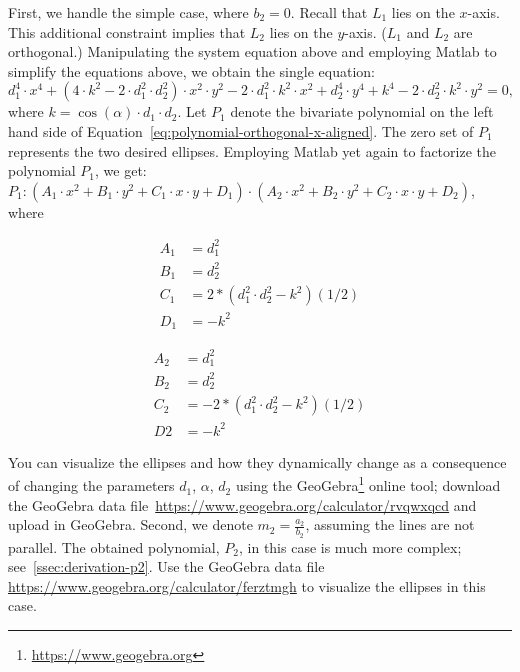First, we handle the simple case, where $b_2 = 0$. Recall that $L_1$ lies on the $x$-axis. This additional constraint implies that $L_2$ lies on the $y$-axis. ($L_1$ and $L_2$ are orthogonal.) Manipulating the system equation above and employing Matlab to simplify the equations above, we obtain the single equation:
\begin{equation}
  d_1^4\cdot x^4 + (4\cdot k^2 - 2\cdot d_1^2\cdot d_2^2)\cdot x^2\cdot y^2 - 2\cdot d_1^2\cdot k^2\cdot x^2 + d_2^4\cdot y^4 + k^4 - 2\cdot d_2^2\cdot k^2\cdot y^2 = 0\label{eq:polynomial-orthogonal-x-aligned},
\end{equation}
where $k = \cos(\alpha)\cdot d_1\cdot d_2$. Let $P_1$ denote the bivariate polynomial on the left hand side of Equation~\ref{eq:polynomial-orthogonal-x-aligned}. The zero set of $P_1$ represents the two desired ellipses. Employing Matlab yet again to factorize the polynomial $P_1$, we get: $P_1: (A_1\cdot x^2 + B_1\cdot y^2 + C_1\cdot x\cdot y + D_1)\cdot (A_2\cdot x^2 + B_2\cdot y^2 + C_2\cdot x\cdot y +D_2)$, where
\begin{minipage}[c]{0.5\linewidth}
\begin{align*}
  A_1 &= d_1^2\\
  B_1 &= d_2^2\\
  C_1 &= 2*(d_1^2\cdot d_2^2 - k^2)(1/2)\\
  D_1 &= -k^2
\end{align*}
\end{minipage}
\begin{minipage}[c]{0.5\linewidth}
\begin{align*}
  A_2 &= d_1^2\\
  B_2 &= d_2^2\\
  C_2 &= -2*(d_1^2\cdot d_2^2 - k^2)(1/2)\\
  D2 &= -k^2
\end{align*}
\end{minipage}
You can visualize the ellipses and how they dynamically change as a
consequence of changing the parameters $d_1$, $\alpha$, $d_2$ using
the GeoGebra\footnote{\url{https://www.geogebra.org}} online tool;
download the GeoGebra data
file~\url{https://www.geogebra.org/calculator/rvqwxqcd} and upload in
GeoGebra. Second, we denote $m_2 = \frac{a_2}{b_2}$, assuming the
lines are not parallel. The obtained polynomial, $P_2$, in this case
is much more complex; see~\ref{ssec:derivation-p2}. Use the GeoGebra data file
\url{https://www.geogebra.org/calculator/ferztmgh} to
visualize the ellipses in this case.
